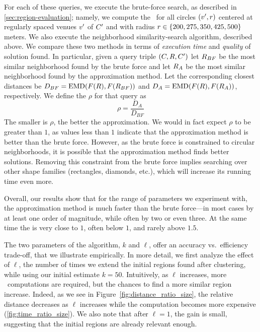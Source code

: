 For each of these queries, we execute the brute-force search, as
described in \autoref{sec:region-evaluation}; namely, 
we compute the \emd\ for all circles $({v}',{r})$ centered at
regularly spaced venues ${v}'$ of ${C}'$ and with radius ${r}\in\{200,
\allowbreak 275, \allowbreak 350, \allowbreak 425, \allowbreak 500\}$ meters.
We also execute the neighborhood similarity-search algorithm,
described above. 
We compare these two methods in terms of \emph{execution time} and
\emph{quality} of solution found. 
In particular, given a query  triple $({C}, {R}, {C}')$
let ${R}_{{BF}}$ be the most similar neighborhood found by
the brute force and 
let ${R}_{{A}}$ be the most similar neighborhood found by
the approximation method. 
Let the corresponding closest distances be
$D_{{BF}} = \mathrm{{EMD}}({F}({R}),{F}({R}_{{BF}}))$
and 
$D_{{A}} = \mathrm{{EMD}}({F}({R}),{F}({R}_{{A}}))$, 
respectively.
We  define the \emph{\Dratio{}} $\rho$ for that query
as  
\begin{equation*}
\rho = \frac{D_{{A}}}{ D_{{BF}} }
\end{equation*}
The smaller is $\rho$, the better the approximation.
We would in fact expect $\rho$ to be greater than $1$, as values less
than $1$ indicate that the approximation method is better than the brute
force.
However, as the brute force is constrained to circular neighborhoods,
it is possible that the approximation method finds better solutions.
Removing this constraint from the brute force implies searching
over other shape families (rectangles, diamonds, etc.), which will
increase its running time even more.

\medskip

Overall, our results show that for the range of parameters we
experiment with, the approximation method is much faster than the brute
force---in most cases by at least one order of magnitude, while
often by two or even three.
At the same time the \Dratio{} is very close to $1$, often below $1$,
and rarely above $1.5$.

The two parameters of the algorithm, $k$ and $\ell$, offer an accuracy vs.\
efficiency trade-off, that we illustrate empirically.
In more detail, we first analyze the effect of $\ell$, the number of times we
extend the initial regions found after clustering, while using our initial
estimate $k=50$. 
Intuitively, as $\ell$ increases, more \emd\ computations are required, but the
chances to find a more similar region increase. Indeed, as we see in
Figure~\ref{fig:distance_ratio_size}, 
the relative distance decreases as $\ell$ increases while the
computation becomes more expensive (\autoref{fig:time_ratio_size}). 
We also note that after $\ell=1$, the gain is small, suggesting that
the initial regions are already relevant enough.

